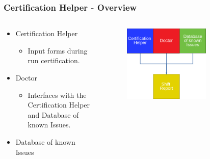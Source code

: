 \documentclass{beamer}
\begin{document}
\begin{frame}
\frametitle{Certification Helper - Overview}
  \begin{columns}[T]
    \begin{column}{.5\textwidth}
     \begin{block}{}

\begin{itemize}
\item Certification Helper
\begin{itemize}
	\item Input forms during run certification.
\end{itemize}
\item Doctor
\begin{itemize}
	\item Interfaces with the Certification Helper and Database of known Issues.
\end{itemize}
\item Database of known Issues
\end{itemize}

   	\end{block}	
    \end{column}
    \begin{column}{.5\textwidth}
    \begin{block}{}
    \begin{figure}[h]
    \phantom{g}
	\includegraphics[width=0.7\textwidth]{figures/overview.png}
			\end{figure}

    \end{block}
    \end{column}
  \end{columns}
\end{frame}
\end{document}
